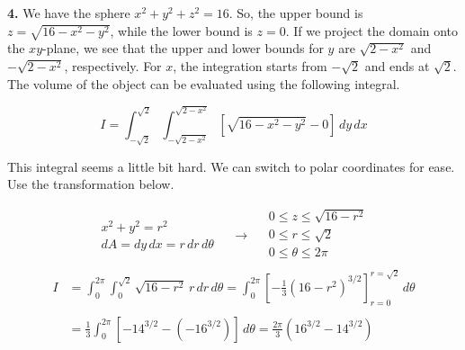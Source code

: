 \documentclass{article}
\begin{document}
\vspace{1em}

\textbf{4.} We have the sphere $x^2+y^2+z^2=16$. So, the upper bound is $z=\sqrt{16-x^2-y^2}$, while the lower bound is $z=0$. If we project the domain onto the $xy$-plane, we see that the upper and lower bounds for $y$ are $\sqrt{2-x^2}$ and $-\sqrt{2-x^2}$, respectively. For $x$, the integration starts from $-\sqrt2$ and ends at $\sqrt2$. The volume of the object can be evaluated using the following integral.

\newpage

\[{I}=\int_{-\sqrt2}^{\sqrt2}\int_{-\sqrt{2-x^2}}^{\sqrt{2-x^2}}\left[\sqrt{16-x^2-y^2}-0 \right]\,dy\,dx\]

This integral seems a little bit hard. We can switch to polar coordinates for ease. Use the transformation below.

\[
\begin{array}{c}
x^2+y^2=r^2\\
dA=dy\,dx =r\,dr\,d\theta
\end{array}\quad\rightarrow\quad
\begin{array}{c}
0\leq z\leq\sqrt{16-r^2}\\
0\leq r\leq \sqrt2\\
0\leq\theta\leq 2\pi\\
\end{array} 
\]
\begin{align*}{I}&=\int_{0}^{2\pi}\int_{0}^{\sqrt{2}}\sqrt{16-r^2}\,r\,dr\,d\theta=\int_{0}^{2\pi}\left[-\frac13\left(16-r^2\right)^{3/2}\right]_{r=0}^{r=\sqrt2}\,d\theta\\\\&=\frac13\int_0^{2\pi}\left[-14^{3/2}-\left(-16^{3/2}\right)\right]\,d\theta=\boxed{\frac{2\pi}{3}\left(16^{3/2}-14^{3/2}\right)}
\end{align*}

\vspace{1em}
\end{document}
